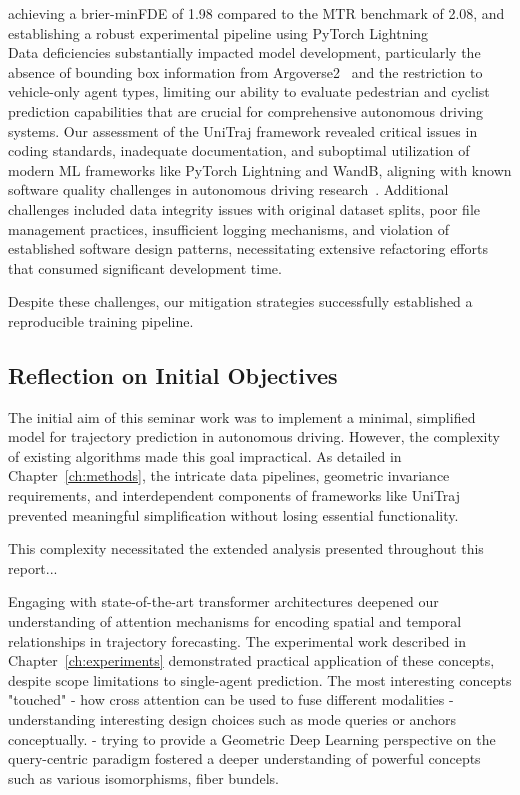 achieving a brier-minFDE of 1.98 compared to the MTR benchmark of 2.08, and establishing a robust experimental pipeline using PyTorch Lightning~\cite{falcon2019pytorch}\\

 Data deficiencies substantially impacted model development, particularly the absence of bounding box information from Argoverse2~\cite{av2Wilson2023} and the restriction to vehicle-only agent types, limiting our ability to evaluate pedestrian and cyclist prediction capabilities that are crucial for comprehensive autonomous driving systems. Our assessment of the UniTraj framework revealed critical issues in coding standards, inadequate documentation, and suboptimal utilization of modern ML frameworks like PyTorch Lightning and WandB, aligning with known software quality challenges in autonomous driving research~\cite{metadriveLi2022}. Additional challenges included data integrity issues with original dataset splits, poor file management practices, insufficient logging mechanisms, and violation of established software design patterns, necessitating extensive refactoring efforts that consumed significant development time.

 Despite these challenges, our mitigation strategies successfully established a reproducible training pipeline.

\subsection{Reflection on Initial Objectives} %
\label{sec:conclusion_objectives}


The initial aim of this seminar work was to implement a minimal, simplified model for trajectory prediction in autonomous driving. However, the complexity of existing algorithms made this goal impractical. As detailed in Chapter~\ref{ch:methods}, the intricate data pipelines, geometric invariance requirements, and interdependent components of frameworks like UniTraj prevented meaningful simplification without losing essential functionality.

This complexity necessitated the extended analysis presented throughout this report...

Engaging with state-of-the-art transformer architectures deepened our understanding of attention mechanisms for encoding spatial and temporal relationships in trajectory forecasting. The experimental work described in Chapter~\ref{ch:experiments} demonstrated practical application of these concepts, despite scope limitations to single-agent prediction.
The most interesting concepts "touched"%
- how cross attention can be used to fuse different modalities
- understanding interesting design choices such as mode queries or anchors conceptually.
- trying to provide a Geometric Deep Learning perspective on the query-centric paradigm fostered a deeper understanding of powerful concepts such as various isomorphisms, fiber bundels.


